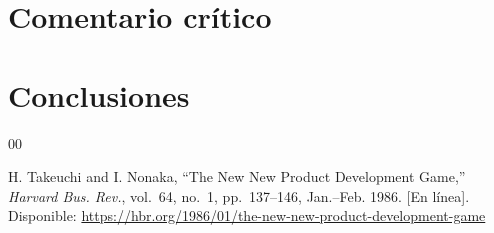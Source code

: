 \documentclass[conference]{IEEEtran}
\begin{document}
\section{Comentario crítico}


\section{Conclusiones}


\begin{thebibliography}{00}

H. Takeuchi and I. Nonaka, ``The New New Product Development Game,'' \emph{Harvard Bus. Rev.}, vol.~64, no.~1, pp.~137--146, Jan.--Feb. 1986. [En línea]. Disponible: \url{https://hbr.org/1986/01/the-new-new-product-development-game}

\end{thebibliography}
\end{document}
